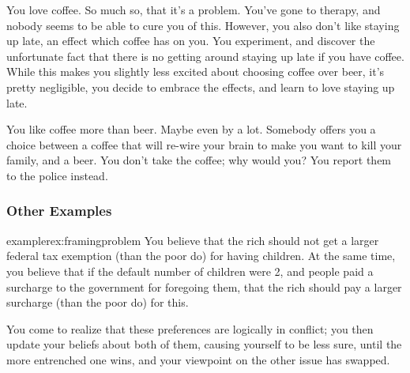 \documentclass{article}
\begin{document}
	\begin{example}
		You love coffee. So much so, that it's a problem. You've gone to therapy, and nobody seems to be able to cure you of this. However, you also don't like staying up late, an effect which coffee has on you. You experiment, and discover the unfortunate fact that there is no getting around staying up late if you have coffee. While this makes you slightly less excited about choosing coffee over beer, it's pretty negligible, you decide to embrace the effects, and learn to love staying up late.
	\end{example}

	\begin{example}
		You like coffee more than beer. Maybe even by a lot. Somebody offers you a choice between a coffee that will re-wire your brain to make you want to kill your family, and a beer. You don't take the coffee; why would you? You report them to the police instead.
	\end{example}

	\subsubsection{Other Examples}
	\begin{restatable}{example}{rex:framingproblem}\label{rex:framingproblem}
		You believe that the rich should not get a larger federal tax exemption (than the poor do) for having children.
		At the same time, you believe that if the default number of children were 2, and people paid a surcharge to the government for foregoing them, that the rich should pay a larger surcharge (than the poor do) for this.
		
		You come to realize that these preferences are logically in conflict; you then update your beliefs about both of them, causing yourself to be less sure, until the more entrenched one wins, and your viewpoint on the other issue has swapped.
	\end{restatable}
\end{document}
